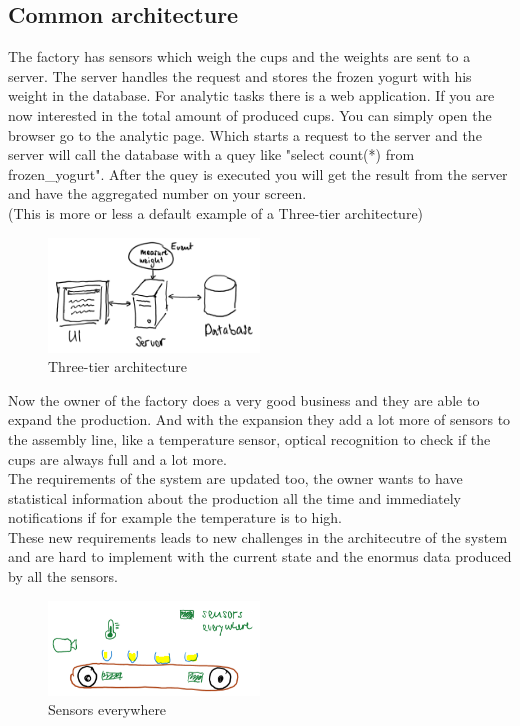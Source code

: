 \subsection{Common architecture}
The factory has sensors which weigh the cups and the weights are sent to a server.
The server handles the request and stores the frozen yogurt with his weight in the database.
For analytic tasks there is a web application. If you are now interested in the total amount of produced cups.
You can simply open the browser go to the analytic page.
Which starts a request to the server and the server will call the database with a quey like "select count(*) from frozen\_yogurt".
After the quey is executed you will get the result from the server and have the aggregated number on your screen.\\
(This is more or less a default example of a Three-tier architecture)

\begin{figure}[H]
\centering
\captionsetup{justification=centering}
\includegraphics[width=0.5\textwidth]{images/three_tier.png}
\caption[Three-tier architecture]{Three-tier architecture}
\end{figure}

\newpage

Now the owner of the factory does a very good business and they are able to expand the production.
And with the expansion they add a lot more of sensors to the assembly line, like a temperature sensor,
optical recognition to check if the cups are always full and a lot more.\\
The requirements of the system are updated too, the owner wants to have statistical information about the production all the time
and immediately notifications if for example the temperature is to high.\\
These new requirements leads to new challenges in the architecutre of the system and are hard to implement with the
current state and the enormus data produced by all the sensors.

\begin{figure}[H]
\centering
\captionsetup{justification=centering}
\includegraphics[width=0.5\textwidth]{images/sensors.png}
\caption[Sensors everywhere]{Sensors everywhere}
\end{figure}

